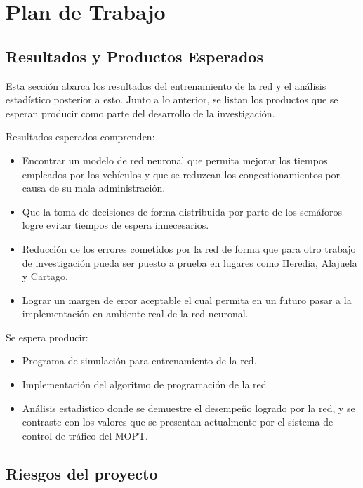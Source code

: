 \chapter{Plan de Trabajo}
	\label{chap:work}
	
	\section{Resultados y Productos Esperados}
	
	Esta secci\'{o}n abarca los resultados del entrenamiento de la red y el
an\'{a}lisis estad\'{i}stico posterior a esto. Junto a lo anterior, se listan
los productos que se esperan producir como parte del desarrollo de la
investigaci\'{o}n.
	
Resultados esperados comprenden:
	\begin{itemize}
	  \item Encontrar un modelo de red neuronal que permita mejorar los tiempos
	  empleados por los veh\'{i}culos y que se reduzcan los congestionamientos por
	  causa de su mala administraci\'{o}n.
	  \item Que la toma de decisiones de forma distribuida por parte de los
	  sem\'{a}foros logre evitar tiempos de espera innecesarios. 
	  \item Reducci\'{o}n de los errores cometidos por la red de forma que para
	  otro trabajo de investigaci\'{o}n pueda ser puesto a prueba en lugares como
	  Heredia, Alajuela y Cartago.
	  \item Lograr un margen de error aceptable el cual permita en un futuro pasar
	  a la implementaci\'{o}n en ambiente real de la red neuronal.
	\end{itemize}

Se espera producir:
	\begin{itemize}
	  \item Programa de simulaci\'{o}n para entrenamiento de la red.
	  \item Implementaci\'{o}n del algoritmo de programaci\'{o}n de la red.
	  \item An\'{a}lisis estad\'{i}stico donde se demuestre el desempe\~{n}o
	  logrado por la red, y se contraste con los valores que se presentan actualmente por
	  el sistema de control de tr\'{a}fico del MOPT.
	\end{itemize}
	
	\section{Riesgos del proyecto}
	
